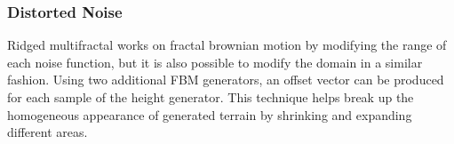 \subsubsection{Distorted Noise}

Ridged multifractal works on fractal brownian motion by modifying the range of each noise function, but it is also possible to modify the domain in a similar fashion.
Using two additional FBM generators, an offset vector can be produced for each sample of the height generator.
This technique helps break up the homogeneous appearance of generated terrain by shrinking and expanding different areas.
